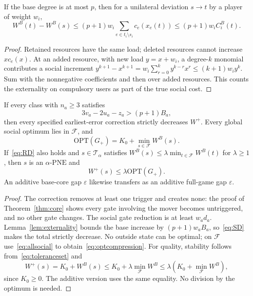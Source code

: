 \documentclass[manuscript,review,anonymous]{acmart}
\newcommand{\PNE}{\mathrm{PNE}}
\newcommand{\OPT}{\mathrm{OPT}}
\newcommand{\F}{\mathcal F}
\begin{document}
\begin{lemma}\label{lem:externality}
If the base degree is at most $p$, then for a unilateral deviation $s\to t$ by a player of weight $w_i$,
\begin{equation}\label{eq:externality}
 W^B(t)-W^B(s)\le(p+1)w_i
 \sum_{e\in t_i\setminus s_i}c_e(x_e(t))
 \le(p+1)w_iC_i^B(t).
\end{equation}
\end{lemma}
\begin{proof}
Retained resources have the same load; deleted resources cannot increase $xc_e(x)$. At an added resource, with new load $y=x+w_i$, a degree-$k$ monomial contributes a social increment $y^{k+1}-x^{k+1}=w_i\sum_{r=0}^ky^{k-r}x^r\le(k+1)w_iy^k$. Sum with the nonnegative coefficients and then over added resources. This counts the externality on compulsory users as part of the true social cost.
\end{proof}
\begin{theorem}\label{thm:socialrepair}
If every class with $n_a\ge3$ satisfies
\begin{equation}\label{eq:SD}
 3v_a-2u_a-z_a>(p+1)B_a,
\end{equation}
then every specified earliest-error correction strictly decreases $W^+$. Every global social optimum lies in $\F$, and
\begin{equation}\label{eq:optcompression}
 \OPT(G_+)=K_0+\min_{s\in\F}W^B(s).
\end{equation}
If~\eqref{eq:RD} also holds and $s\in\mathcal T_\alpha$ satisfies
$W^B(s)\le\lambda\min_{t\in\F}W^B(t)$ for $\lambda\ge1$, then $s$ is an $\alpha$-$\PNE$ and
\begin{equation}\label{eq:qualitytransfer}
 W^+(s)\le\lambda\OPT(G_+).
\end{equation}
An additive base-core gap $\varepsilon$ likewise transfers as an additive full-game gap $\varepsilon$.
\end{theorem}
\begin{proof}
The correction removes at least one trigger and creates none: the proof of Theorem~\ref{thm:core} shows every gate involving the mover becomes untriggered, and no other gate changes. The social gate reduction is at least $w_ad_a$. Lemma~\ref{lem:externality} bounds the base increase by $(p+1)w_aB_a$, so~\eqref{eq:SD} makes the total strictly decrease. No outside state can be optimal; on $\F$ use~\eqref{eq:allsocial} to obtain~\eqref{eq:optcompression}. For quality, stability follows from~\eqref{eq:toleranceset} and
\[
 W^+(s)=K_0+W^B(s)
 \le K_0+\lambda\min_{\F}W^B
 \le\lambda(K_0+\min_{\F}W^B),
\]
since $K_0\ge0$. The additive version uses the same equality. No division by the optimum is needed.
\end{proof}
\end{document}
